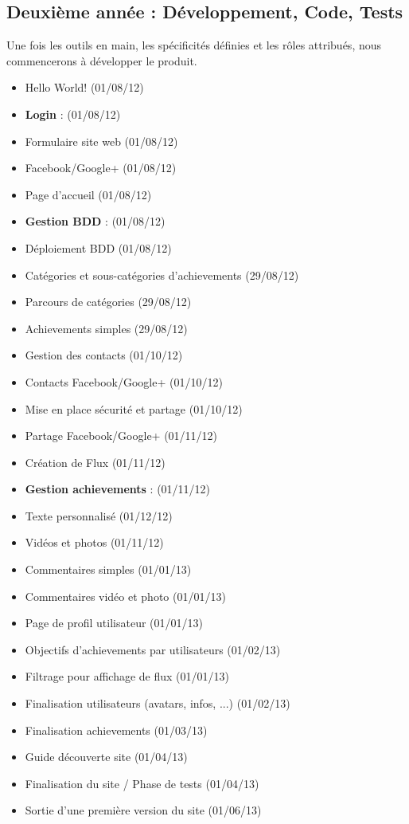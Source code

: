 \documentclass{life-fr}
\begin{document}
\subsection{ Deuxième année : Développement, Code, Tests}
Une fois les outils en main, les spécificités définies et les rôles attribués, nous commencerons à développer le produit.\\
\begin{itemize}
  \item Hello World! (01/08/12)
  \item \textbf{Login} : (01/08/12)
  \item Formulaire site web (01/08/12)
  \item Facebook/Google+ (01/08/12)
  \item Page d'accueil (01/08/12)
  \item \textbf{Gestion BDD} : (01/08/12)
  \item Déploiement BDD (01/08/12)
  \item Catégories et sous-catégories d'achievements (29/08/12)
  \item Parcours de catégories (29/08/12)
  \item Achievements simples (29/08/12)
  \item Gestion des contacts (01/10/12)
  \item Contacts Facebook/Google+ (01/10/12)
  \item Mise en place sécurité et partage (01/10/12)
  \item Partage Facebook/Google+ (01/11/12)
  \item Création de Flux (01/11/12)
  \item \textbf{Gestion achievements} : (01/11/12)
  \item Texte personnalisé (01/12/12)
  \item Vidéos et photos (01/11/12)
  \item Commentaires simples (01/01/13)
  \item Commentaires vidéo et photo (01/01/13)
  \item Page de profil utilisateur (01/01/13)
  \item Objectifs d'achievements par utilisateurs (01/02/13)
  \item Filtrage pour affichage de flux (01/01/13)
  \item Finalisation utilisateurs (avatars, infos, ...) (01/02/13)
  \item Finalisation achievements (01/03/13)
  \item Guide découverte site (01/04/13)
  \item Finalisation du site / Phase de tests (01/04/13)
  \item Sortie d'une première version du site (01/06/13)
\end{itemize}
\end{document}
